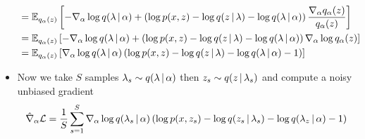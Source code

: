 \begin{itemize}
\begin{align*}
 &= \mathbb{E}_{q_\alpha(z)}\left[ - \nabla_\alpha \log q(\lambda \, | \, \alpha) + \left(\log p(x,z) - \log q(z \, | \, \lambda) - \log q(\lambda \, | \, \alpha)\right)  \frac{\nabla_\alpha q_\alpha(z)}{q_\alpha(z)}\right] \\
 &= \mathbb{E}_{q_\alpha(z)}\left[ - \nabla_\alpha \log q(\lambda \, | \, \alpha) + \left(\log p(x,z) - \log q(z \, | \, \lambda) - \log q(\lambda \, | \, \alpha)\right)  \nabla_\alpha \log q_\alpha(z) \right] \\
 &= \mathbb{E}_{q_\alpha(z)}\left[  \nabla_\alpha \log q(\lambda \, | \, \alpha) \left(\log p(x,z) - \log q(z \, | \, \lambda) - \log q(\lambda \, | \, \alpha) - 1 \right) \right]
\end{align*}

\item Now we take $S$ samples $\lambda_s \sim q(\lambda \, | \, \alpha)$ then $z_s \sim q(z \, | \, \lambda_s)$ and compute a noisy unbiased gradient
\[\hat\nabla_\alpha\mathcal{L} = \frac{1}{S} \sum_{s=1}^S \nabla_\alpha \log q(\lambda_s \, | \, \alpha) \left(\log p(x,z_s) - \log q(z_s \, | \, \lambda_s) - \log q(\lambda_z \, | \, \alpha) - 1\right) \]
\end{itemize}



